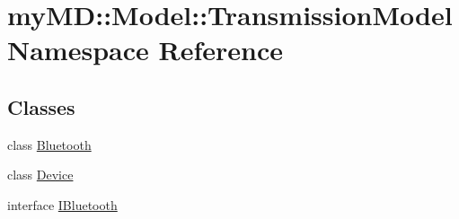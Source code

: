 \hypertarget{namespacemy_m_d_1_1_model_1_1_transmission_model}{
\section{my\-MD::Model::Transmission\-Model Namespace Reference}
\label{d6/daa/namespacemy_m_d_1_1_model_1_1_transmission_model}
}


\subsection*{Classes}
\begin{CompactItemize}
\item 
class \hyperlink{classmy_m_d_1_1_model_1_1_transmission_model_1_1_bluetooth}{Bluetooth}
\item 
class \hyperlink{classmy_m_d_1_1_model_1_1_transmission_model_1_1_device}{Device}
\item 
interface \hyperlink{interfacemy_m_d_1_1_model_1_1_transmission_model_1_1_i_bluetooth}{IBluetooth}
\end{CompactItemize}
